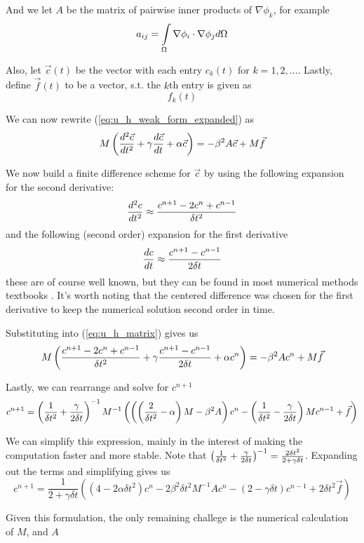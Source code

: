 And we let $A$ be the matrix of pairwise inner products of $\nabla \phi_k$, for example
\begin{equation} \label{eq:a_definition}
a_{ij} = \int\limits_{\Omega} \nabla \phi_i \cdot \nabla \phi_j d\Omega
\end{equation}

Also, let $\vec{c}(t)$ be the vector with each entry $c_k(t)$ for $k=1, 2, \ldots$. Lastly, define
$\vec{f}(t)$ to be a vector, s.t. the $k$th entry is given as 
\begin{equation} \label{eq:vec_F_definition}
f_k(t)
\end{equation}

We can now rewrite (\ref{eq:u_h_weak_form_expanded}) as
\begin{equation} \label{eq:u_h_matrix}
M\left( \frac{d^2 \vec{c}}{d t^2} + \gamma\frac{d \vec{c}}{d t} + \alpha \vec{c} \right) = - \beta^2 A \vec{c} + M\vec{f}
\end{equation}

We now build a finite difference scheme for $\vec{c}$ by using the following expansion for the second derivative:
\begin{equation} \label{eq:second_derivative_finite_difference}
\frac{d^2 c}{d t^2} \approx \frac{c^{n+1} - 2c^n + c^{n-1}}{\delta t^2}
\end{equation}
and the following (second order) expansion for the first derivative
\begin{equation} \label{eq:first_derivative_finite_difference}
\frac{d c}{d t} \approx \frac{c^{n+1} - c^{n-1}}{2\delta t}
\end{equation}
these are of course well known, but they can be found in most numerical methods textbooks \cite{difference_formulas}.
It's worth noting that the centered difference was chosen for the first derivative to keep the numerical solution second
order in time.

Substituting into (\ref{eq:u_h_matrix}) gives us
\begin{equation} \label{eq:finite_diff_weak_form}
M \left( \frac{c^{n+1} - 2c^n + c^{n-1}}{\delta t^2} + \gamma \frac{c^{n+1} - c^{n-1}}{2\delta t} + \alpha c^n \right) = - \beta^2 A c^n + M\vec{f}
\end{equation}

Lastly, we can rearrange and solve for $c^{n+1}$
\begin{equation} \label{eq:finite_diff_solution}
c^{n+1} = \left( \frac{1}{\delta t^2} + \frac{\gamma}{2\delta t} \right)^{-1} M^{-1}
\left(
\left( \left(\frac{2}{\delta t^2} - \alpha\right) M - \beta^2 A \right) c^n
-
\left( \frac{1}{\delta t^2} - \frac{\gamma}{2\delta t} \right) M c^{n-1}
+
\vec{f}
\right)
\end{equation}

We can simplify this expression, mainly in the interest of making the computation faster and more stable. Note
that $\left( \frac{1}{\delta t^2} + \frac{\gamma}{2\delta t} \right)^{-1} = \frac{2\delta t^2}{2 + \gamma\delta t}$. Expanding out the terms and simplifying gives us
\begin{equation}
c^{n+1}
=
\frac{1}{2 + \gamma\delta t} \left(
(4 - 2\alpha\delta t^2)c^n  - 2\beta^2\delta t^2M^{-1}Ac^n
- (2 - \gamma\delta t)c^{n-1}
+ 2\delta t^2 \vec{f}
\right)
\end{equation}

Given this formulation, the only remaining challege is the numerical calculation of $M$, and $A$
